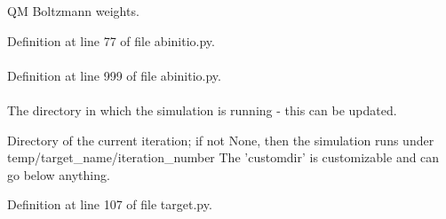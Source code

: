 \-Q\-M \-Boltzmann weights. 



\-Definition at line 77 of file abinitio.\-py.

\hypertarget{classforcebalance_1_1abinitio_1_1AbInitio_ac4f8e85daeccb2e46b724eddc76d38e1}{
\paragraph[{respterm}]{}}\label{classforcebalance_1_1abinitio_1_1AbInitio_ac4f8e85daeccb2e46b724eddc76d38e1}


\-Definition at line 999 of file abinitio.\-py.

\hypertarget{classforcebalance_1_1target_1_1Target_a1da470037ef61c22dc44beb85cfa01a9}{
\paragraph[{rundir}]{}}\label{classforcebalance_1_1target_1_1Target_a1da470037ef61c22dc44beb85cfa01a9}


\-The directory in which the simulation is running -\/ this can be updated. 

\-Directory of the current iteration; if not \-None, then the simulation runs under temp/target\-\_\-name/iteration\-\_\-number \-The 'customdir' is customizable and can go below anything.

\-Definition at line 107 of file target.\-py.

\hypertarget{classforcebalance_1_1abinitio_1_1AbInitio_a430661954fff8c1979eb9ac28523bb5e}{
\paragraph[{save\-\_\-vmvals}]{}}\label{classforcebalance_1_1abinitio_1_1AbInitio_a430661954fff8c1979eb9ac28523bb5e}


